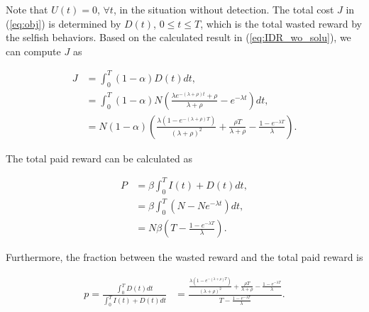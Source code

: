 Note that $U(t)=0$, $\forall t$,
in the situation without detection.
The total cost $J$ in (\ref{eq:obj}) is determined by $D(t)$, $0 \le t \le T$,
which is the total wasted reward by the selfish behaviors.
Based on the calculated result in (\ref{eq:IDR_wo_solu}),
we can compute $J$ as
\begin{small}
\begin{equation}
\label{eq:IDR_wo_J}
\begin{aligned}
J &= \int_{0}^{T} (1-\alpha) D(t) dt, \\
&= \int_{0}^{T} (1-\alpha) N (\frac{\lambda e^{-(\lambda + \rho)t} + \rho}{ \lambda + \rho } - e^{- \lambda t}) dt, \\
&= N (1-\alpha) \left( \frac{\lambda (1-e^{-(\lambda+\rho)T})}{ (\lambda + \rho)^{2} }
+ \frac{\rho T}{\lambda + \rho}
- \frac{1-e^{-\lambda T}}{\lambda} \right).
\end{aligned}
\end{equation}
\end{small}
The total paid reward can be calculated as
\begin{small}
\begin{equation}
\nonumber
\begin{aligned}
P &= \beta \int_{0}^{T} I(t) + D(t) dt, \\
&= \beta \int_{0}^{T} (N - N e^{- \lambda t}) dt, \\
&= N \beta (T - \frac{ 1 - e^{-\lambda T} }{\lambda} ).
\end{aligned}
\end{equation}
\end{small}
Furthermore, the fraction between the wasted reward and the total paid reward is
\begin{small}
\begin{equation}
\nonumber
\begin{aligned}
p = \frac{\int_{0}^{T} D(t) dt}{\int_{0}^{T} I(t) + D(t) dt}
&= \frac{ \frac{\lambda (1-e^{-(\lambda+\rho)T})}{ (\lambda + \rho)^{2} }
+ \frac{\rho T}{\lambda + \rho}
- \frac{1-e^{-\lambda T}}{\lambda} }
{T - \frac{ 1 - e^{-\lambda T} }{\lambda} }.
\end{aligned}
\end{equation}
\end{small}

